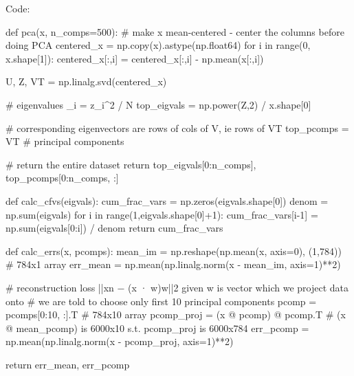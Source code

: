 \documentclass[submit]{harvardml}
\begin{document}
Code:

\begin{python}
def pca(x, n_comps=500):
    # make x mean-centered - center the columns before doing PCA
    centered_x = np.copy(x).astype(np.float64)
    for i in range(0, x.shape[1]):
        centered_x[:,i] = centered_x[:,i] - np.mean(x[:,i])
    
    U, Z, VT = np.linalg.svd(centered_x)
    
    # eigenvalues \lambda_i = z_i^2 / N
    top_eigvals = np.power(Z,2) / x.shape[0]
    
    # corresponding eigenvectors are rows of cols of V, ie rows of VT
    top_pcomps = VT   # principal components 
    
    
    # return the entire dataset
    return top_eigvals[0:n_comps], top_pcomps[0:n_comps, :]

def calc_cfvs(eigvals):
    cum_frac_vars = np.zeros(eigvals.shape[0])
    denom = np.sum(eigvals)
    for i in range(1,eigvals.shape[0]+1):
        cum_frac_vars[i-1] = np.sum(eigvals[0:i]) / denom
    return cum_frac_vars

def calc_errs(x, pcomps):
    mean_im = np.reshape(np.mean(x, axis=0), (1,784)) # 784x1 array
    err_mean = np.mean(np.linalg.norm(x - mean_im, axis=1)**2)
    
    # reconstruction loss ||xn − (x · w)w||2 given w is vector which we project data onto
    # we are told to choose only first 10 principal components
    pcomp = pcomps[0:10, :].T  # 784x10 array
    pcomp_proj = (x @ pcomp) @ pcomp.T   # (x @ mean_pcomp) is 6000x10 s.t. pcomp_proj is 6000x784
    err_pcomp = np.mean(np.linalg.norm(x - pcomp_proj, axis=1)**2)
    
    return err_mean, err_pcomp
\end{python}
\end{document}
